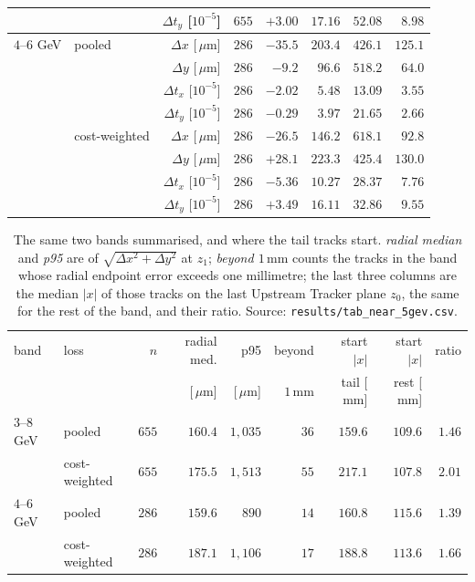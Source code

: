 \documentclass[11pt,a4paper]{article}
\newcommand{\um}{\ensuremath{\,\mu\mathrm{m}}}
\newcommand{\mm}{\ensuremath{\,\mathrm{mm}}}
\begin{document}
\begin{table}[tbp]
\begin{tabular}{llrrrrrr}
                 &               & $\Delta t_y$ [$10^{-5}$] & $655$ & $+3.00$ & $17.16$ & $52.08$ & $8.98$ \\
    \midrule
    $4$--$6$ GeV & pooled        & $\Delta x$ [\!\um]      & $286$ & $-35.5$ & $203.4$ & $426.1$ & $125.1$ \\
                 &               & $\Delta y$ [\!\um]      & $286$ & $-9.2$  & $96.6$  & $518.2$ & $64.0$ \\
                 &               & $\Delta t_x$ [$10^{-5}$] & $286$ & $-2.02$ & $5.48$  & $13.09$ & $3.55$ \\
                 &               & $\Delta t_y$ [$10^{-5}$] & $286$ & $-0.29$ & $3.97$  & $21.65$ & $2.66$ \\
    \addlinespace
                 & cost-weighted & $\Delta x$ [\!\um]      & $286$ & $-26.5$ & $146.2$ & $618.1$ & $92.8$ \\
                 &               & $\Delta y$ [\!\um]      & $286$ & $+28.1$ & $223.3$ & $425.4$ & $130.0$ \\
                 &               & $\Delta t_x$ [$10^{-5}$] & $286$ & $-5.36$ & $10.27$ & $28.37$ & $7.76$ \\
                 &               & $\Delta t_y$ [$10^{-5}$] & $286$ & $+3.49$ & $16.11$ & $32.86$ & $9.55$ \\
    \bottomrule
  \end{tabular}
\end{table}

\begin{table}[tbp]
  \centering
  \caption{The same two bands summarised, and where the tail tracks start.
  \emph{radial median} and \emph{p95} are of $\sqrt{\Delta x^2 + \Delta y^2}$ at
  $z_1$; \emph{beyond $1\mm$} counts the tracks in the band whose radial
  endpoint error exceeds one millimetre; the last three columns are the median
  $|x|$ of those tracks on the last Upstream Tracker plane $z_0$, the same for
  the rest of the band, and their ratio. Source:
  \texttt{results/tab\_near\_5gev.csv}.}
  \label{tab:near5tail}
  \footnotesize
  \setlength{\tabcolsep}{5pt}
  \begin{tabular}{llrrrrrrr}
    \toprule
    band & loss & $n$ & radial med. & p95 & beyond & start $|x|$ & start $|x|$ & ratio \\
    & & & [\!\um] & [\!\um] & $1\mm$ & tail [\!\mm] & rest [\!\mm] & \\
    \midrule
    $3$--$8$ GeV & pooled        & $655$ & $160.4$ & $1{,}035$ & $36$ & $159.6$ & $109.6$ & $1.46$ \\
                 & cost-weighted & $655$ & $175.5$ & $1{,}513$ & $55$ & $217.1$ & $107.8$ & $2.01$ \\
    $4$--$6$ GeV & pooled        & $286$ & $159.6$ & $\phantom{0}890$ & $14$ & $160.8$ & $115.6$ & $1.39$ \\
                 & cost-weighted & $286$ & $187.1$ & $1{,}106$ & $17$ & $188.8$ & $113.6$ & $1.66$ \\
    \bottomrule
  \end{tabular}
\end{table}
\end{document}

